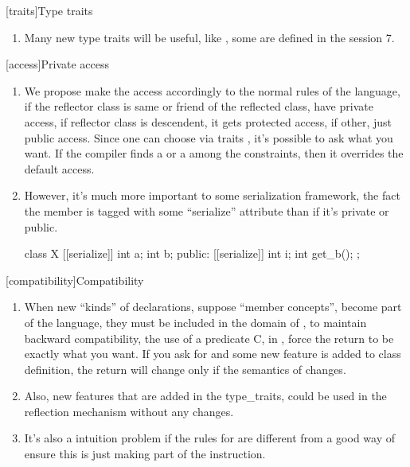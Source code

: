 [traits]{Type traits}
\begin{enumerate}
\item Many new type traits will be useful, like , some are defined in the session 7.
\end{enumerate}
[access]{Private access}
\begin{enumerate}
\item We propose make the access accordingly to the normal rules of the language, if the reflector class is same or friend of the reflected class,  have private access, if reflector class is descendent, it gets protected access, if other, just public access. Since one can choose via traits , it's possible to ask what you want. If the compiler finds a  or a  among the constraints, then it overrides the default access.
\item However, it's much more important to some serialization framework, the fact the member is tagged with some ``serialize'' attribute than if it's private or public.
\begin{codeblock}
class X {
 [[serialize]] int a;
 int b;
public:
 [[serialize]] int i;
 int get_b();
};
\end{codeblock}
\end{enumerate}
[compatibility]{Compatibility}
\begin{enumerate}
\item When new ``kinds'' of declarations, suppose ``member concepts'', become part of the language, they must be included in the domain of , to maintain backward compatibility, the use of a predicate C, in , force the return to be exactly what you want. If you ask for  and some new feature is added to class definition, the return will change only if the semantics of  changes.
\item Also, new features that are added in the type_traits, could be used in the reflection mechanism without any changes.
\item It's also a intuition problem if the rules for  are different from  a good way of ensure this is just making  part of the instruction.
\end{enumerate}
